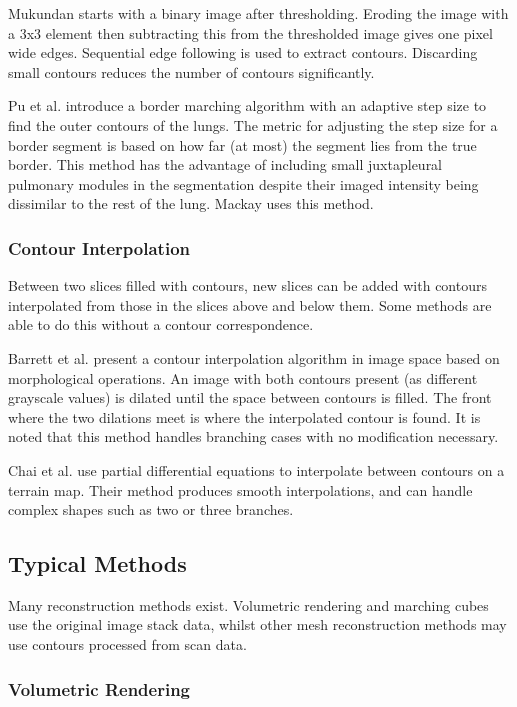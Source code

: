 \documentclass[11p, titlepage]{article}
\begin{document}
Mukundan \cite{mukundan2016reconstruction} starts with a binary image after thresholding. Eroding the image with a 3x3 element then subtracting this from the thresholded image gives one pixel wide edges. Sequential edge following is used to extract contours. Discarding small contours reduces the number of contours significantly.

Pu et al. \cite{pu2008adaptive} introduce a border marching algorithm with an adaptive step size to find the outer contours of the lungs. The metric for adjusting the step size for a border segment is based on how far (at most) the segment lies from the true border. This method has the advantage of including small juxtapleural pulmonary modules in the segmentation despite their imaged intensity being dissimilar to the rest of the lung. Mackay \cite{mackay2019robust} uses this method.

\subsubsection{Contour Interpolation}

Between two slices filled with contours, new slices can be added with contours interpolated from those in the slices above and below them. Some methods are able to do this without a contour correspondence.

Barrett et al. \cite{barrett1994image} present a contour interpolation algorithm in image space based on morphological operations. An image with both contours present (as different grayscale values) is dilated until the space between contours is filled. The front where the two dilations meet is where the interpolated contour is found. It is noted that this method handles branching cases with no modification necessary.

Chai et al. \cite{chai1998contour} use partial differential equations to interpolate between contours on a terrain map. Their method produces smooth interpolations, and can handle complex shapes such as two or three branches.

\subsection{Typical Methods}

Many reconstruction methods exist. Volumetric rendering and marching cubes use the original image stack data, whilst other mesh reconstruction methods may use contours processed from scan data.

\subsubsection{Volumetric Rendering}
\end{document}
